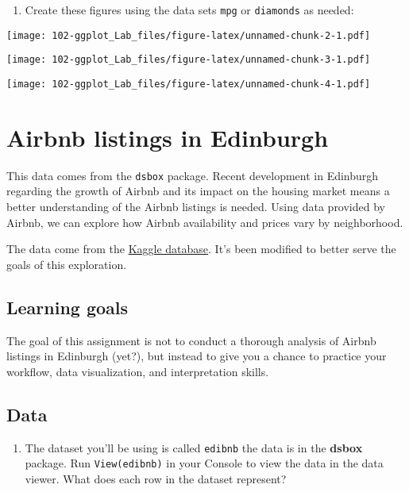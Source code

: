 \documentclass[
]{book}
\providecommand{\tightlist}{%
  \setlength{\itemsep}{0pt}\setlength{\parskip}{0pt}}
\begin{document}
\begin{enumerate}
\def\labelenumi{\arabic{enumi}.}
\tightlist
\item
  Create these figures using the data sets \texttt{mpg} or \texttt{diamonds} as needed:
\end{enumerate}

\texttt{[image: 102-ggplot\_Lab\_files/figure-latex/unnamed-chunk-2-1.pdf]}

\texttt{[image: 102-ggplot\_Lab\_files/figure-latex/unnamed-chunk-3-1.pdf]}

\texttt{[image: 102-ggplot\_Lab\_files/figure-latex/unnamed-chunk-4-1.pdf]}

\hypertarget{airbnb-listings-in-edinburgh}{%
\section{Airbnb listings in Edinburgh}\label{airbnb-listings-in-edinburgh}}

This data comes from the \texttt{dsbox} package. Recent development in Edinburgh regarding the growth of Airbnb and its impact on the housing market means a better understanding of the Airbnb listings is needed. Using data provided by Airbnb, we can explore how Airbnb availability and prices vary by neighborhood.

The data come from the \href{https://www.kaggle.com/thoroc/edinburgh-inside-airbnb/version/2}{Kaggle database}. It's
been modified to better serve the goals of this exploration.

\hypertarget{learning-goals}{%
\subsection{Learning goals}\label{learning-goals}}

The goal of this assignment is not to conduct a thorough analysis of Airbnb listings in Edinburgh (yet?), but instead to give you a chance to practice your workflow, data visualization, and interpretation skills.

\hypertarget{data}{%
\subsection{Data}\label{data}}

\begin{enumerate}
\def\labelenumi{\arabic{enumi}.}
\setcounter{enumi}{1}
\tightlist
\item
  The dataset you'll be using is called \texttt{edibnb} the data is in the \textbf{dsbox} package. Run \texttt{View(edibnb)} in your Console to view the data in the data viewer. What does each row in the dataset represent?
\end{enumerate}
\end{document}
